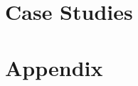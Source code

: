 \documentclass{book}
\begin{document}
% 
% 
% 
% 
% 
% 
% 
% 
% 
% 
% 

\part{Case Studies}
\label{part:case-studies}




\part{Appendix}
\appendix









\printindex
\end{document}
